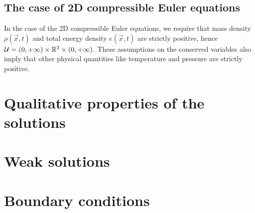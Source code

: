 \clearpage


\subsection*{The case of 2D compressible Euler equations}

In the case of the 2D compressible Euler equations, we require that
mass density $\rho(\vec{x},t)$ and total energy density $e(\vec{x},t)$
are strictly positive, hence
$\mathcal{U} = (0,+\infty) \times \mathbb{R}^2 \times (0,+\infty)$.
These assumptions on the conserved variables also imply that
other physical quantities like temperature and pressure are strictly
positive.

\section{Qualitative properties of the solutions}

\section{Weak solutions}

\section{Boundary conditions}











